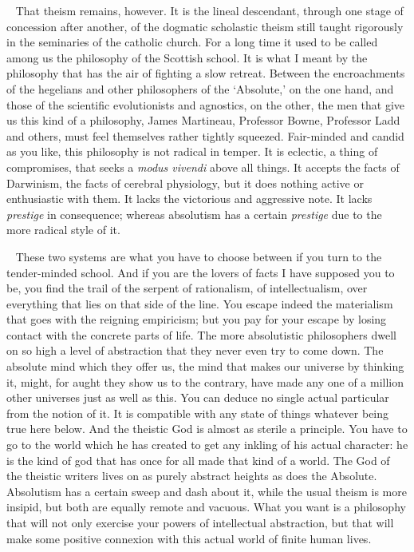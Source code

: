 \documentclass[12pt]{article}
\newcounter{wjparagraph}[section]
\newcommand*{\wjparagraph}{\stepcounter{wjparagraph}~\marginpar{\tiny\arabic{wjparagraph} }}
\begin{document}
\wjparagraph
That theism remains, however. It is the lineal descendant, through one stage of concession after another, of the dogmatic scholastic theism still taught rigorously in the seminaries of the catholic church. For a long time it used to be called among us the philosophy of the Scottish school. It is what I meant by the philosophy that has the air of fighting a slow retreat. Between the encroachments of the hegelians and other philosophers of the `Absolute,' on the one hand, and those of the scientific evolutionists and agnostics, on the other, the men that give us this kind of a philosophy, James Martineau, Professor Bowne, Professor Ladd and others, must feel themselves rather tightly squeezed. Fair-minded and candid as you like, this philosophy is not radical in temper. It is eclectic, a thing of compromises, that seeks a \emph{modus vivendi} above all things. It accepts the facts of Darwinism, the facts of cerebral physiology, but it does nothing active or enthusiastic with them. It lacks the victorious and aggressive note. It lacks \emph{prestige} in consequence; whereas absolutism has a certain \emph{prestige} due to the more radical style of it.

\wjparagraph
These two systems are what you have to choose between if you turn to the tender-minded school. And if you are the lovers of facts I have supposed you to be, you find the trail of the serpent of rationalism, of intellectualism, over everything that lies on that side of the line. You escape indeed the materialism that goes with the reigning empiricism; but you pay for your escape by losing contact with the concrete parts of life. The more absolutistic philosophers dwell on so high a level of abstraction that they never even try to come down. The absolute mind which they offer us, the mind that makes our universe by thinking it, might, for aught they show us to the contrary, have made any one of a million other universes just as well as this. You can deduce no single actual particular from the notion of it. It is compatible with any state of things whatever being true here below. And the theistic God is almost as sterile a principle. You have to go to the world which he has created to get any inkling of his actual character: he is the kind of god that has once for all made that kind of a world. The God of the theistic writers lives on as purely abstract heights as does the Absolute. Absolutism has a certain sweep and dash about it, while the usual theism is more insipid, but both are equally remote and vacuous. What you want is a philosophy that will not only exercise your powers of intellectual abstraction, but that will make some positive connexion with this actual world of finite human lives.
\end{document}

